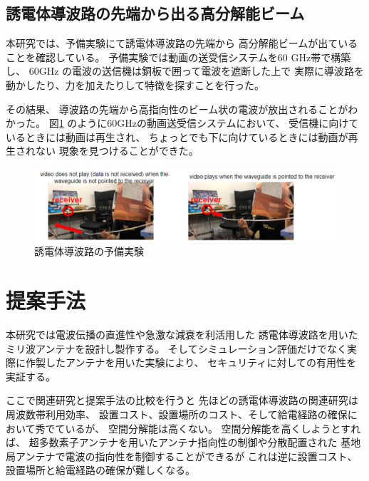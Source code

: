 \documentclass[technicalreport]{ieicej}
\begin{document}
\subsection{誘電体導波路の先端から出る高分解能ビーム}

本研究では、予備実験にて誘電体導波路の先端から
高分解能ビームが出ていることを確認している。
予備実験では動画の送受信システムを60 GHz帯で構築し、
60GHz の電波の送信機は銅板で囲って電波を遮断した上で
実際に導波路を動かしたり、力を加えたりして特徴を探すことを行った。

その結果、
導波路の先端から高指向性のビーム状の電波が放出されることがわかった。
図\ref{fig:qualitative_experiment}
のように60GHzの動画送受信システムにおいて、
受信機に向けているときには動画は再生され、
ちょっとでも下に向けているときには動画が再生されない
現象を見つけることができた。

\begin{figure}[t]
  \begin{center}
    \includegraphics[bb=0 0 630.087950 152.271255, width=1.0\linewidth]{img/qualitative_experiment.pdf}
    \caption{誘電体導波路の予備実験}
    \label{fig:qualitative_experiment}
  \end{center}
\end{figure}


\section{提案手法}

本研究では電波伝播の直進性や急激な減衰を利活用した
誘電体導波路を用いたミリ波アンテナを設計し製作する。
そしてシミュレーション評価だけでなく実際に作製したアンテナを用いた実験により、
セキュリティに対しての有用性を実証する。

ここで関連研究と提案手法の比較を行うと
先ほどの誘電体導波路の関連研究は周波数帯利用効率、
設置コスト、設置場所のコスト、そして給電経路の確保において秀でているが、
空間分解能は高くない。
空間分解能を高くしようとすれば、
超多数素子アンテナを用いたアンテナ指向性の制御や分散配置された
基地局アンテナで電波の指向性を制御することができるが
これは逆に設置コスト、設置場所と給電経路の確保が難しくなる。
\end{document}
